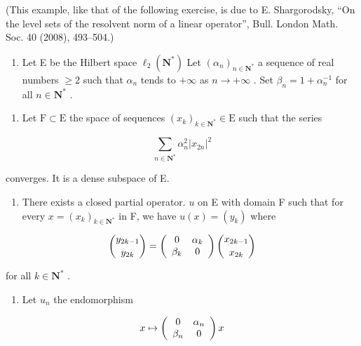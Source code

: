 (This example, like that of the following exercise, is due to E. Shargorodsky, “On the level sets of the resolvent norm of a linear operator”, Bull. London Math. Soc. 40 (2008), 493–504.)

\begin{enumerate}
\def\labelenumi{\arabic{enumi})}
\setcounter{enumi}{18}
\tightlist
\item
  Let E be the Hilbert space \(\ell_2(\mathbf{N}^*)\) Let \((\alpha_n)_{n \in \mathbf{N}^*}\) a sequence of real numbers \(\geqslant 2\) such that \(\alpha_n\) tends to \(+\infty\) as \(n \to +\infty\) . Set \(\beta_n = 1 + \alpha_n^{-1}\) for all \(n \in \mathbf{N}^*\) .
\end{enumerate}

\begin{enumerate}
\def\labelenumi{\alph{enumi})}
\tightlist
\item
  Let \(\mathrm{F}\subset \mathrm{E}\) the space of sequences \((x_{k})_{k\in \mathbf{N}^{*}}\in \mathrm{E}\) such that the series
\end{enumerate}

\[
\sum_ {n \in \mathbf {N} ^ {*}} \alpha_ {n} ^ {2} | x _ {2 n} | ^ {2}
\]

converges. It is a dense subspace of E.

\begin{enumerate}
\def\labelenumi{\alph{enumi})}
\setcounter{enumi}{1}
\tightlist
\item
  There exists a closed partial operator. \(u\) on E with domain F such that for every \(x = (x_{k})_{k \in \mathbf{N}^{*}}\) in F, we have \(u(x) = (y_{k})\) where
\end{enumerate}

\[
\binom{y _ {2 k - 1}}{y _ {2 k}} = \left( \begin{array}{c c} 0 & \alpha_ {k} \\ \beta_ {k} & 0 \end{array} \right) \binom{x _ {2 k - 1}}{x _ {2 k}}
\]

for all \(k \in \mathbf{N}^*\) .

\begin{enumerate}
\def\labelenumi{\alph{enumi})}
\setcounter{enumi}{2}
\tightlist
\item
  Let \(u_{n}\) the endomorphism
\end{enumerate}

\[
x \mapsto \left( \begin{array}{c c} 0 & \alpha_ {n} \\ \beta_ {n} & 0 \end{array} \right) x
\]

